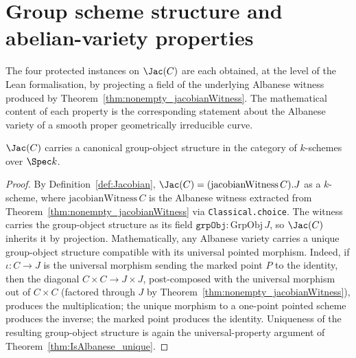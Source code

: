 \section{Group scheme structure and abelian-variety properties}
The four protected instances on \(\Jac(C)\) are each obtained, at the level of the Lean formalisation, by projecting a field of the underlying Albanese witness produced by Theorem~\ref{thm:nonempty_jacobianWitness}. The mathematical content of each property is the corresponding statement about the Albanese variety of a smooth proper geometrically irreducible curve.
\begin{theorem}
  \label{thm:Jacobian_grpObj}
  \(\Jac(C)\) carries a canonical group-object structure in the category of \(k\)-schemes over \(\Spec k\).
\end{theorem}
\begin{proof}

\leanok
  By Definition~\ref{def:Jacobian}, \(\Jac(C) = (\mathrm{jacobianWitness}\, C).J\) as a \(k\)-scheme, where \(\mathrm{jacobianWitness}\, C\) is the Albanese witness extracted from Theorem~\ref{thm:nonempty_jacobianWitness} via \texttt{Classical.choice}. The witness carries the group-object structure as its field \(\mathtt{grpObj} : \mathrm{GrpObj}\, J\), so \(\Jac(C)\) inherits it by projection.
  Mathematically, any Albanese variety carries a unique group-object structure compatible with its universal pointed morphism. Indeed, if \(\iota \colon C \to J\) is the universal morphism sending the marked point \(P\) to the identity, then the diagonal \(C \times C \to J \times J\), post-composed with the universal morphism out of \(C \times C\) (factored through \(J\) by Theorem~\ref{thm:nonempty_jacobianWitness}), produces the multiplication; the unique morphism to a one-point pointed scheme produces the inverse; the marked point produces the identity. Uniqueness of the resulting group-object structure is again the universal-property argument of Theorem~\ref{thm:IsAlbanese_unique}.
\end{proof}
